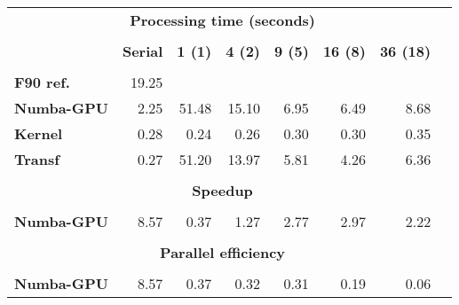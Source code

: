 \begin{tabular}{lrrrrrrr}\toprule
\multicolumn{7}{c}{\textbf{Processing time (seconds)}} \\
\cline{2-7}\vspace{-9pt} & & & & & & \\
&\textbf{Serial} &\textbf{1 (1)} &\textbf{4 (2)} &\textbf{9 (5)} &\textbf{16 (8)} &\textbf{36 (18)} \\
\hline\vspace{-9pt} & & & & & & \\
\textbf{F90 ref.} &19.25 & & & & & \\
\textbf{Numba-GPU} &2.25 &51.48 &15.10 &6.95 &6.49 &8.68 \\
\textbf{Kernel} &0.28 &0.24 &0.26 &0.30 &0.30 &0.35 \\
\textbf{Transf} &0.27 &51.20 &13.97 &5.81 &4.26 &6.36 \\
\hline\vspace{-9pt} & & & & & & \\
\multicolumn{7}{c}{\textbf{Speedup}} \\
\cline{2-7}\vspace{-9pt} & & & & & & \\
\textbf{Numba-GPU} &8.57 &0.37 &1.27 &2.77 &2.97 &2.22 \\
\hline\vspace{-9pt} & & & & & & \\
\multicolumn{7}{c}{\textbf{Parallel efficiency}} \\
\cline{2-7}\vspace{-9pt} & & & & & & \\
\textbf{Numba-GPU} &8.57 &0.37 &0.32 &0.31 &0.19 &0.06 \\
\bottomrule
\end{tabular}